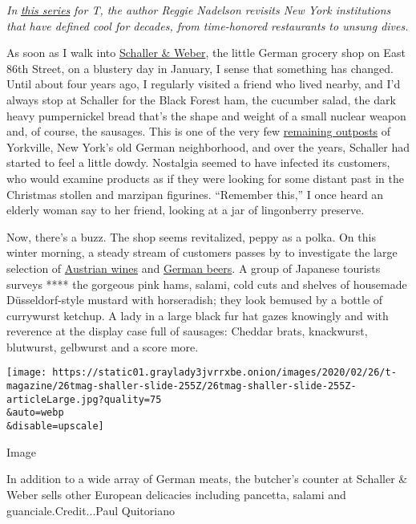 \emph{In}
\href{https://www.nytimes3xbfgragh.onion/column/the-212?module=inline}{\emph{this
series}} \emph{for T, the author Reggie Nadelson revisits New York
institutions that have defined cool for decades, from time-honored
restaurants to unsung dives.}

As soon as I walk into \href{https://schallerweber.com/}{Schaller \&
Weber}, the little German grocery shop on East 86th Street, on a
blustery day in January, I sense that something has changed. Until about
four years ago, I regularly visited a friend who lived nearby, and I'd
always stop at Schaller for the Black Forest ham, the cucumber salad,
the dark heavy pumpernickel bread that's the shape and weight of a small
nuclear weapon and, of course, the sausages. This is one of the very few
\href{https://www.nytimes3xbfgragh.onion/2019/07/29/nyregion/yorkville-tall-buildings-nyc.html}{remaining
outposts} of Yorkville, New York's old German neighborhood, and over the
years, Schaller had started to feel a little dowdy. Nostalgia seemed to
have infected its customers, who would examine products as if they were
looking for some distant past in the Christmas stollen and marzipan
figurines. ``Remember this,'' I once heard an elderly woman say to her
friend, looking at a jar of lingonberry preserve.

Now, there's a buzz. The shop seems revitalized, peppy as a polka. On
this winter morning, a steady stream of customers passes by to
investigate the large selection of
\href{https://www.nytimes3xbfgragh.onion/topic/subject/austrian-wines}{Austrian
wines} and
\href{https://www.nytimes3xbfgragh.onion/2016/05/15/world/europe/beer-purity-law-a-german-tradition-and-marketing-tool-turns-500.html}{German
beers}. A group of Japanese tourists surveys **** the gorgeous pink
hams, salami, cold cuts and shelves of housemade Düsseldorf-style
mustard with horseradish; they look bemused by a bottle of currywurst
ketchup. A lady in a large black fur hat gazes knowingly and with
reverence at the display case full of sausages: Cheddar brats,
knackwurst, blutwurst, gelbwurst and a score more.

\texttt{[image: https://static01.graylady3jvrrxbe.onion/images/2020/02/26/t-magazine/26tmag-shaller-slide-255Z/26tmag-shaller-slide-255Z-articleLarge.jpg?quality=75\\\&auto=webp\\\&disable=upscale]}

Image

In addition to a wide array of German meats, the butcher's counter at
Schaller \& Weber sells other European delicacies including pancetta,
salami and guanciale.Credit...Paul Quitoriano

